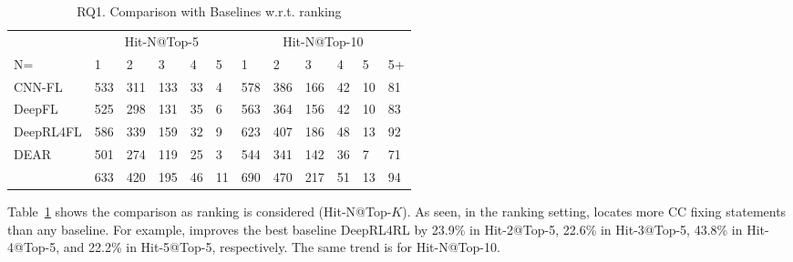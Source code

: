 


\begin{table}[t]
	\caption{RQ1. Comparison with Baselines w.r.t. ranking}
        \vspace{-9pt}
	{\small
		\begin{center}
			\renewcommand{\arraystretch}{1}
			\begin{tabular}{p{1.3cm}<{\centering}|p{0.3cm}<{\centering}|p{0.3cm}<{\centering}|p{0.3cm}<{\centering}|p{0.2cm}<{\centering}|p{0.2cm}<{\centering}||p{0.3cm}<{\centering}|p{0.3cm}<{\centering}|p{0.3cm}<{\centering}|p{0.2cm}<{\centering}|p{0.2cm}<{\centering}|p{0.2cm}<{\centering}}
				\hline
				    & \multicolumn{5}{c||}{Hit-N@Top-5}& \multicolumn{6}{c}{Hit-N@Top-10}\\
				\cline{2-12} N= 
											 &1&2&3&4&5&1&2&3&4&5&5+\\
				
				\hline
				CNN-FL      & 533 & 311 & 133 & 33 & 4 & 578 & 386 & 166 & 42 & 10 & 81 \\
				DeepFL		& 525 & 298 & 131 & 35 & 6 & 563 & 364 & 156 & 42 & 10 & 83 \\
				DeepRL4FL	& 586 & 339 & 159 & 32 & 9 & 623 & 407 & 186 & 48 & 13 & 92 \\
                                DEAR	& 501 & 274 & 119 & 25 & 3 & 544 & 341 & 142 & 36 & 7 & 71 \\
				\hline
				\tool       & 633 & 420 & 195 & 46 & 11& 690 & 470 & 217 & 51 & 13 & 94 \\
				\hline
			\end{tabular}
			
			\label{fig:rq1-rank}
		\end{center}
	}
\end{table}

Table~\ref{fig:rq1-rank} shows the comparison as ranking is considered
(Hit-N@Top-$K$).  As seen,
in the ranking setting, {\tool} locates more CC fixing
statements than any baseline.
For example, {\tool} improves the best baseline DeepRL4RL
by 23.9\% in Hit-2@Top-5, 22.6\% in Hit-3@Top-5, 43.8\% in
Hit-4@Top-5, and 22.2\% in Hit-5@Top-5, respectively. The same trend
is for Hit-N@Top-10.


